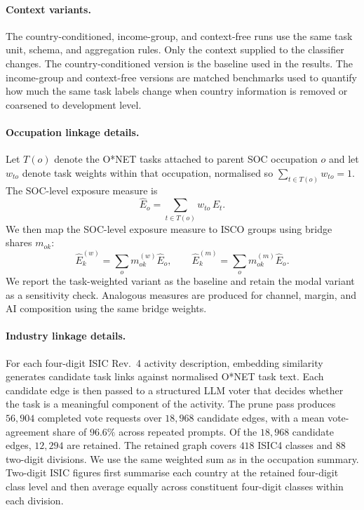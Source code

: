 \documentclass[11pt]{article}
\begin{document}
\paragraph{Context variants.} The country-conditioned, income-group, and context-free runs use the same task unit, schema, and aggregation rules. Only the context supplied to the classifier changes. The country-conditioned version is the baseline used in the results. The income-group and context-free versions are matched benchmarks used to quantify how much the same task labels change when country information is removed or coarsened to development level.

\paragraph{Occupation linkage details.} Let $T(o)$ denote the O*NET tasks attached to parent SOC occupation $o$ and let $w_{to}$ denote task weights within that occupation, normalised so $\sum_{t\in T(o)} w_{to}=1$. The SOC-level exposure measure is
\[
\widehat{E}_{o}=\sum_{t\in T(o)} w_{to}\,E_t.
\]
We then map the SOC-level exposure measure to ISCO groups using bridge shares $m_{ok}$:
\[
\widehat{E}^{(w)}_{k}=\sum_{o} m^{(w)}_{ok}\widehat{E}_{o}, \qquad
\widehat{E}^{(m)}_{k}=\sum_{o} m^{(m)}_{ok}\widehat{E}_{o}.
\]
We report the task-weighted variant as the baseline and retain the modal variant as a sensitivity check. Analogous measures are produced for channel, margin, and AI composition using the same bridge weights.

\paragraph{Industry linkage details.} For each four-digit ISIC Rev.~4 activity description, embedding similarity generates candidate task links against normalised O*NET task text. Each candidate edge is then passed to a structured LLM voter that decides whether the task is a meaningful component of the activity. The prune pass produces $56{,}904$ completed vote requests over $18{,}968$ candidate edges, with a mean vote-agreement share of $96.6\%$ across repeated prompts. Of the $18{,}968$ candidate edges, $12{,}294$ are retained. The retained graph covers $418$ ISIC4 classes and $88$ two-digit divisions. We use the same weighted sum as in the occupation summary. Two-digit ISIC figures first summarise each country at the retained four-digit class level and then average equally across constituent four-digit classes within each division.
\end{document}
